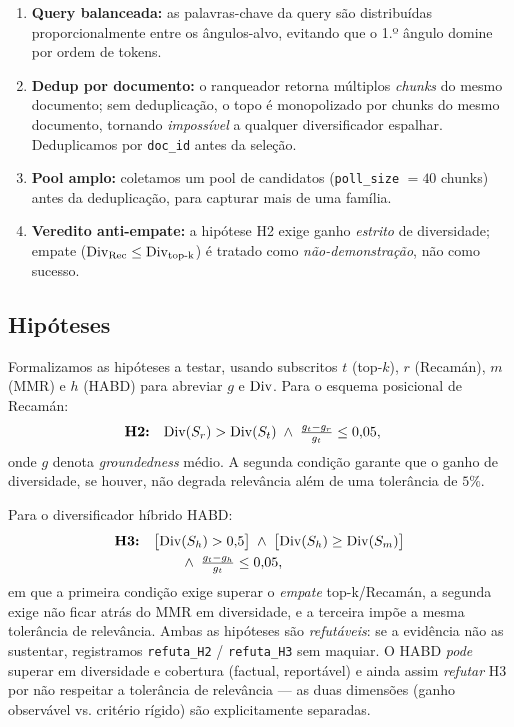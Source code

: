 \begin{enumerate}
  \item \textbf{Query balanceada:} as palavras-chave da query são distribuídas
        proporcionalmente entre os ângulos-alvo, evitando que o 1.º ângulo domine
        por ordem de tokens.
  \item \textbf{Dedup por documento:} o ranqueador retorna múltiplos \emph{chunks}
        do mesmo documento; sem deduplicação, o topo é monopolizado por chunks do
        mesmo documento, tornando \emph{impossível} a qualquer diversificador
        espalhar. Deduplicamos por \texttt{doc\_id} antes da seleção.
  \item \textbf{Pool amplo:} coletamos um pool de candidatos (\texttt{poll\_size}
        $=40$ chunks) antes da deduplicação, para capturar mais de uma família.
  \item \textbf{Veredito anti-empate:} a hipótese H2 exige ganho \emph{estrito} de
        diversidade; empate ($\mathrm{Div}_{\text{Rec}}\le \mathrm{Div}_{\text{top-k}}$) é tratado
        como \emph{não-demonstração}, não como sucesso.
\end{enumerate}

\subsection{Hipóteses}

Formalizamos as hipóteses a testar, usando subscritos $t$ (top-$k$),
$r$ (Recamán), $m$ (MMR) e $h$ (HABD) para abreviar $g$ e $\mathrm{Div}$. Para o esquema
posicional de Recamán:
\[
\begin{aligned}
\textbf{H2:}\quad & \mathrm{Div}(S_r) > \mathrm{Div}(S_t)
  \;\wedge\; \tfrac{g_t - g_r}{g_t} \le 0{,}05,
\end{aligned}
\]
onde $g$ denota \emph{groundedness} médio. A segunda condição garante que o
ganho de diversidade, se houver, não degrada relevância além de uma tolerância de
$5\%$.

Para o diversificador híbrido HABD:
\[
\begin{aligned}
\textbf{H3:}\quad & \bigl[\mathrm{Div}(S_h) > 0{,}5\bigr]
  \;\wedge\; \bigl[\mathrm{Div}(S_h) \ge \mathrm{Div}(S_m)\bigr]\\[-1pt]
&\qquad \wedge\; \tfrac{g_t - g_h}{g_t} \le 0{,}05,
\end{aligned}
\]
em que a primeira condição exige superar o \emph{empate} top-k/Recamán, a segunda
exige não ficar atrás do MMR em diversidade, e a terceira impõe a mesma tolerância
de relevância. Ambas as hipóteses são \emph{refutáveis}: se a evidência não as
sustentar, registramos \texttt{refuta\_H2} / \texttt{refuta\_H3} sem maquiar. O
HABD \emph{pode} superar em diversidade e cobertura (factual, reportável) e ainda
assim \emph{refutar} H3 por não respeitar a tolerância de relevância — as duas
dimensões (ganho observável vs. critério rígido) são explicitamente separadas.
